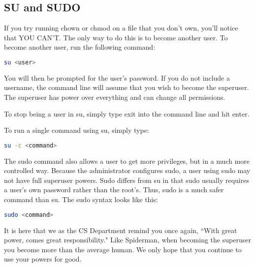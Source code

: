 \documentclass[11pt,a4paper]{article}
\begin{document}
\subsection*{SU and SUDO}

\indent\indent If you try running chown or chmod on a file that you don't own, you'll notice that YOU CAN'T. The only way to do this is to become another user. To become another user, run the following command:

\begin{lstlisting}[basicstyle=\ttfamily, backgroundcolor = \color{lightgray}, language = bash, xleftmargin = 0cm, framexleftmargin = 1em, breaklines=true]
su <user>
\end{lstlisting}
			
You will then be prompted for the user's password. If you do not include a username, the command line will assume that you wish to become the superuser. The superuser has power over everything and can change all permissions.

To stop being a user in su, simply type exit into the command line and hit enter.

To run a single command using su, simply type:

\begin{lstlisting}[basicstyle=\ttfamily, backgroundcolor = \color{lightgray}, language = bash, xleftmargin = 0cm, framexleftmargin = 1em, breaklines=true]
su -c <command>
\end{lstlisting}
	
The sudo command also allows a user to get more privileges, but in a much more controlled way. Because the administrator configures sudo,  a user using sudo may not have full superuser powers. Sudo differs from su in that sudo usually requires a user's own password rather than the root's. Thus, sudo is a much safer command than su. The sudo syntax looks like this:

\begin{lstlisting}[basicstyle=\ttfamily, backgroundcolor = \color{lightgray}, language = bash, xleftmargin = 0cm, framexleftmargin = 1em, breaklines=true]
sudo <command>
\end{lstlisting}
		 
It is here that we as the CS Department remind you once again, ``With great power, comes great responsibility." Like Spiderman, when becoming the superuser you become more than the average human. We only hope that you continue to use your powers for good. \\
\end{document}
